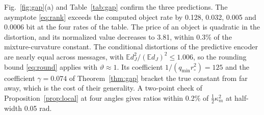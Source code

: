 \documentclass[10pt,journal]{IEEEtran}
\newcommand{\E}{\mathbb E}
\begin{document}
Fig.~\ref{fig:gap}(a) and Table~\ref{tab:gap} confirm the three predictions. The asymptote \eqref{eq:rank} exceeds the computed object rate by 0.128, 0.032, 0.005 and 0.0006 bit at the four rates of the table. The price of an object is quadratic in the distortion, and its normalized value decreases to 3.81, within 0.3\% of the mixture-curvature constant. The conditional distortions of the predictive encoder are nearly equal across messages, with $\E d_J^2/(\E d_J)^2\le1.006$, so the rounding bound \eqref{eq:round} applies with $\vartheta\approx1$. Its coefficient $1/(q_{\min}r_\circ^2)=125$ and the coefficient $\gamma=0.074$ of Theorem~\ref{thm:gap} bracket the true constant from far away, which is the cost of their generality. A two-point check of Proposition~\ref{prop:local} at four angles gives ratios within 0.2\% of $\frac12\kappa_m^2$ at half-width 0.05 rad.
\end{document}

